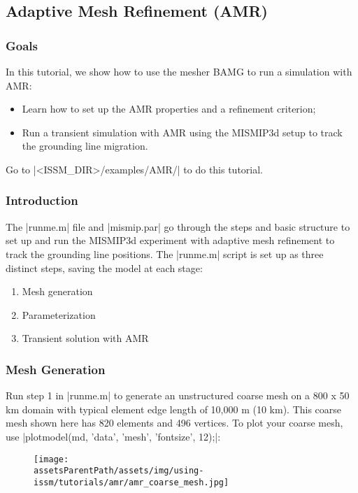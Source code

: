 
\subsection{Adaptive Mesh Refinement (AMR)} \label{sec:using-issm-tutorials-amr}
\subsubsection{Goals} %
In this tutorial, we show how to use the mesher BAMG to run a simulation with AMR:
\begin{itemize}
	\item Learn how to set up the AMR properties and a refinement criterion;
	\item Run a transient simulation with AMR using the MISMIP3d setup to track the grounding line migration.
\end{itemize} 

Go to \lstinlinebg|<ISSM_DIR>/examples/AMR/| to do this tutorial.
\subsubsection{Introduction}
The \lstinlinebg|runme.m| file and \lstinlinebg|mismip.par| go through the steps and basic structure to set up and run the MISMIP3d experiment with adaptive mesh refinement to track the grounding line positions. The \lstinlinebg|runme.m| script is set up as three distinct steps, saving the model at each stage:
\begin{enumerate}
	\item Mesh generation
	\item Parameterization
	\item Transient solution with AMR
\end{enumerate}

\subsubsection{Mesh Generation}
Run step 1 in \lstinlinebg|runme.m| to generate an unstructured coarse mesh on a 800 x 50 km domain with typical element edge length of 10,000 m (10 km).  This coarse mesh shown here has 820 elements and 496 vertices. To plot your coarse mesh, use \lstinlinebg|plotmodel(md, 'data', 'mesh', 'fontsize', 12);|:
\begin{figure}[H]
	\begin{center}
		\texttt{[image: \\assetsParentPath/assets/img/using-issm/tutorials/amr/amr\_coarse\_mesh.jpg]}
	\end{center}
\end{figure}


